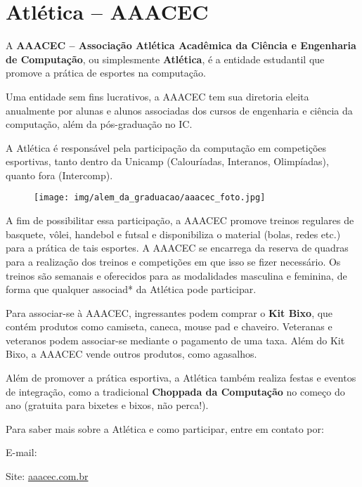 
\section{Atlética -- AAACEC}

A \textbf{AAACEC -- Associação Atlética Acadêmica da Ciência e Engenharia de
Computação}, ou simplesmente \textbf{Atlética}, é a entidade estudantil que
promove a prática de esportes na computação.

Uma entidade sem fins lucrativos, a AAACEC tem sua diretoria eleita anualmente
por alunas e alunos associadas dos cursos de engenharia e ciência da
computação, além da pós-graduação no IC.

A Atlética é responsável pela participação da computação em competições
esportivas, tanto dentro da Unicamp (Calouríadas, Interanos, Olimpíadas),
quanto fora (Intercomp).

\begin{figure}[H]
  \centering
  \texttt{[image: img/alem\_da\_graduacao/aaacec\_foto.jpg]}
\end{figure}

A fim de possibilitar essa participação, a AAACEC promove treinos regulares de
basquete, vôlei, handebol e futsal e disponibiliza o material (bolas, redes
etc.) para a prática de tais esportes. A AAACEC se encarrega da reserva de
quadras para a realização dos treinos e competições em que isso se fizer
necessário. Os treinos são semanais e oferecidos para as modalidades masculina
e feminina, de forma que qualquer associad* da Atlética pode participar.

Para associar-se à AAACEC, ingressantes podem comprar o \textbf{Kit Bixo},
que contém produtos co\-mo camiseta, caneca, mouse pad e chaveiro. Veteranas
e veteranos podem associar-se mediante o pagamento de uma taxa. Além do Kit
Bixo, a AAACEC vende outros produtos, como agasalhos.

Além de promover a prática esportiva, a Atlética também realiza festas e
eventos de integração, como a tradicional \textbf{Choppada da Computação} no
começo do ano (gratuita para bixetes e bixos, não perca!).

Para saber mais sobre a Atlética e como participar, entre em contato por:
\begin{compactitemize}
\item E-mail: 
\item Site: \url{aaacec.com.br}
\end{compactitemize}
